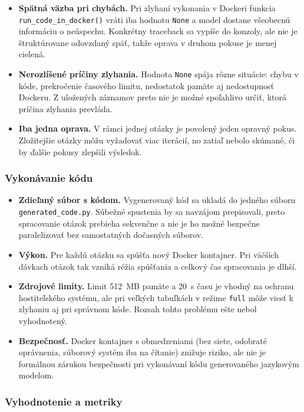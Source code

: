 \begin{itemize}
    \item \textbf{Spätná väzba pri chybách.} Pri zlyhaní vykonania v Dockeri funkcia \texttt{run\_code\_in\_docker()} vráti iba hodnotu \texttt{None} a model dostane všeobecnú informáciu o neúspechu. Konkrétny traceback sa vypíše do konzoly, ale nie je štruktúrovane odovzdaný späť, takže oprava v druhom pokuse je menej cielená.
    \item \textbf{Nerozlíšené príčiny zlyhania.} Hodnota \texttt{None} spája rôzne situácie: chybu v kóde, prekročenie časového limitu, nedostatok pamäte aj nedostupnosť Dockeru. Z uložených záznamov preto nie je možné spoľahlivo určiť, ktorá príčina zlyhania prevláda.
    \item \textbf{Iba jedna oprava.} V rámci jednej otázky je povolený jeden opravný pokus. Zložitejšie otázky môžu vyžadovať viac iterácií, no zatiaľ nebolo skúmané, či by ďalšie pokusy zlepšili výsledok.
\end{itemize}

\subsubsection*{Vykonávanie kódu}

\begin{itemize}
    \item \textbf{Zdieľaný súbor s kódom.} Vygenerovaný kód sa ukladá do jedného súboru \texttt{generated\_code.py}. Súbežné spustenia by sa navzájom prepisovali, preto spracovanie otázok prebieha sekvenčne a nie je ho možné bezpečne paralelizovať bez samostatných dočasných súborov.
    \item \textbf{Výkon.} Pre každú otázku sa spúšťa nový Docker kontajner. Pri väčších dávkach otázok tak vzniká réžia spúšťania a celkový čas spracovania je dlhší.
    \item \textbf{Zdrojové limity.} Limit 512~MB pamäte a 20~s času je vhodný na ochranu hostiteľského systému, ale pri veľkých tabuľkách v režime \texttt{full} môže viesť k zlyhaniu aj pri správnom kóde. Rozsah tohto problému ešte nebol vyhodnotený.
    \item \textbf{Bezpečnosť.} Docker kontajner s obmedzeniami (bez siete, odobraté oprávnenia, súborový systém iba na čítanie) znižuje riziko, ale nie je formálnou zárukou bezpečnosti pri vykonávaní kódu generovaného jazykovým modelom.
\end{itemize}

\subsubsection*{Vyhodnotenie a metriky}

